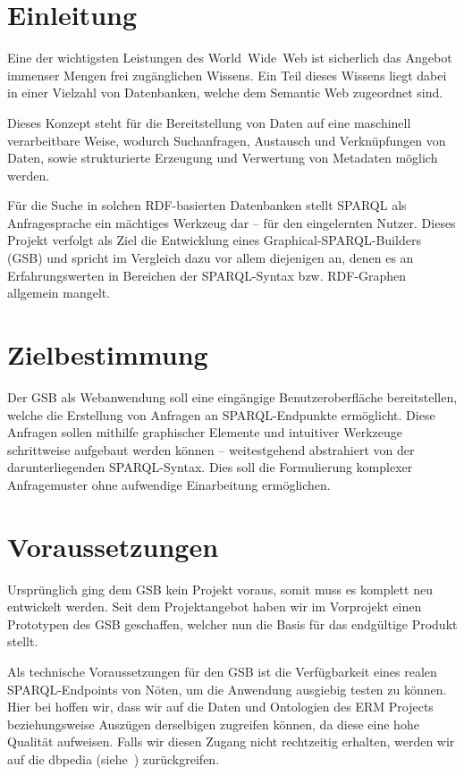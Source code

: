 \section{Einleitung}
Eine der wichtigsten Leistungen des World~Wide~Web ist sicherlich das
Angebot immenser Mengen frei zugänglichen Wissens.
Ein Teil dieses Wissens liegt dabei in einer Vielzahl von Datenbanken,
welche dem Semantic Web zugeordnet sind.

Dieses Konzept steht für die Bereitstellung von Daten auf eine
maschinell verarbeitbare Weise, wodurch Suchanfragen, Austausch und
Verknüpfungen von Daten, sowie strukturierte Erzeugung und Verwertung
von Metadaten möglich werden.

Für die Suche in solchen RDF-basierten Datenbanken stellt SPARQL als Anfragesprache ein mächtiges Werkzeug dar -- für den eingelernten Nutzer. Dieses Projekt verfolgt als Ziel die Entwicklung eines Graphical-SPARQL-Builders (GSB) und spricht im Vergleich dazu vor allem diejenigen an, denen es an Erfahrungswerten in Bereichen der SPARQL-Syntax bzw. RDF-Graphen allgemein mangelt.

\section{Zielbestimmung}
Der GSB als Webanwendung soll eine eingängige Benutzeroberfläche
bereitstellen, welche die Erstellung von Anfragen an SPARQL-Endpunkte
ermöglicht. Diese Anfragen sollen mithilfe graphischer Elemente und
intuitiver Werkzeuge schrittweise aufgebaut werden können --
weitestgehend abstrahiert von der darunterliegenden
SPARQL-Syntax. Dies soll die Formulierung komplexer Anfragemuster ohne
aufwendige Einarbeitung ermöglichen.

\section{Voraussetzungen}
Ursprünglich ging dem GSB kein Projekt voraus, somit muss es komplett
neu entwickelt werden.
Seit dem Projektangebot haben wir im Vorprojekt einen Prototypen des
GSB geschaffen, welcher nun die Basis für das endgültige Produkt
stellt.

Als technische Voraussetzungen für den GSB ist die Verfügbarkeit eines
realen SPARQL-Endpoints von Nöten, um die Anwendung ausgiebig testen
zu können. Hier bei hoffen wir, dass wir auf die Daten und Ontologien
des ERM Projects~\cite{aksw} beziehungsweise
Auszügen derselbigen zugreifen können, da diese eine hohe Qualität
aufweisen. Falls wir diesen Zugang nicht rechtzeitig erhalten, werden
wir auf die dbpedia (siehe~\cite{dbpedia}) zurückgreifen.

